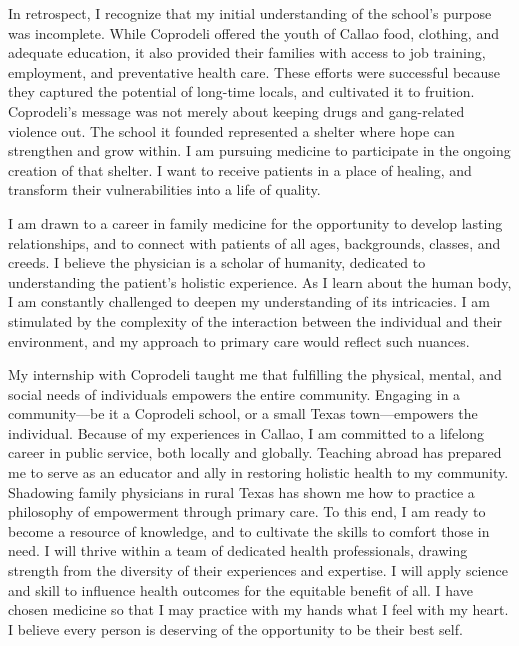 \documentclass[12pt,a4paper,roman]{moderncv} %
\begin{document}
\medskip

In retrospect, I recognize that my initial understanding of the school's purpose was incomplete. While Coprodeli offered the youth of Callao food, clothing, and adequate education, it also provided their families with access to job training, employment, and preventative health care. These efforts were successful because they captured the potential of long-time locals, and cultivated it to fruition. Coprodeli's message was not merely about keeping drugs and gang-related violence out. The school it founded represented a shelter where hope can strengthen and grow within. I am pursuing medicine to participate in the ongoing creation of that shelter. I want to receive patients in a place of healing, and transform their vulnerabilities into a life of quality.

\medskip

I am drawn to a career in family medicine for the opportunity to develop lasting relationships, and to connect with patients of all ages, backgrounds, classes, and creeds. I believe the physician is a scholar of humanity, dedicated to understanding the patient's holistic experience. As I learn about the human body, I am constantly challenged to deepen my understanding of its intricacies. I am stimulated by the complexity of the interaction between the individual and their environment, and my approach to primary care would reflect such nuances. 

\medskip

My internship with Coprodeli taught me that fulfilling the physical, mental, and social needs of individuals empowers the entire community. Engaging in a community---be it a Coprodeli school, or a small Texas town---empowers the individual. Because of my experiences in Callao, I am committed to a lifelong career in public service, both locally and globally. Teaching abroad has prepared me to serve as an educator and ally in restoring holistic health to my community. Shadowing family physicians in rural Texas has shown me how to practice a philosophy of empowerment through primary care. To this end, I am ready to become a resource of knowledge, and to cultivate the skills to comfort those in need.  I will thrive within a team of dedicated health professionals, drawing strength from the diversity of their experiences and expertise. I will apply science and skill to influence health outcomes for the equitable benefit of all. I have chosen medicine so that I may practice with my hands what I feel with my heart. I believe every person is deserving of the opportunity to be their best self.
\end{document}
